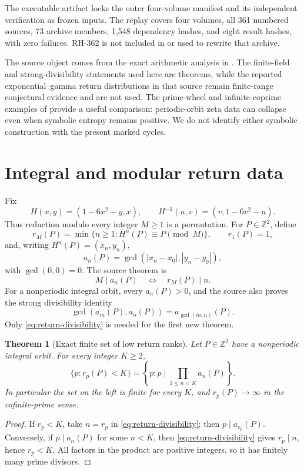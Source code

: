 \documentclass[11pt]{article}
\newtheorem{theorem}{Theorem}[section]
\theoremstyle{remark}
\newcommand{\Z}{\mathbb Z}
\begin{document}
The executable artifact locks the outer four-volume manifest and its
independent verification as frozen inputs.  The replay covers four volumes,
all 361 numbered sources, 73 archive members, 1,548 dependency hashes, and
eight result hashes, with zero failures.  RH-362 is not included in or used to
rewrite that archive.

The source object comes from the exact arithmetic analysis in
\citet{WangPrimeReturns2026}.  The finite-field and strong-divisibility
statements used here are theorems, while the reported exponential--gamma
return distributions in that source remain finite-range conjectural evidence
and are not used.  The prime-wheel and infinite-coprime examples of
\citet{WangPeriodicCollapse2026} provide a useful comparison: periodic-orbit
zeta data can collapse even when symbolic entropy remains positive.  We do
not identify either symbolic construction with the present marked cycles.

\section{Integral and modular return data}

Fix
\[
 H(x,y)=(1-6x^2-y,x),
 \qquad
 H^{-1}(u,v)=(v,1-6v^2-u).
\]
Thus reduction modulo every integer \(M\ge1\) is a permutation.  For
\(P\in\Z^2\), define
\[
 r_M(P)=\min\{n\ge1:H^n(P)\equiv P\pmod M\},
 \qquad r_1(P)=1,
\]
and, writing \(H^n(P)=(x_n,y_n)\),
\[
 a_n(P)=\gcd(|x_n-x_0|,|y_n-y_0|),
\]
with \(\gcd(0,0)=0\).  The source theorem is
\begin{equation}
 M\mid a_n(P)
 \quad\Longleftrightarrow\quad
 r_M(P)\mid n.
 \label{eq:return-divisibility}
\end{equation}
For a nonperiodic integral orbit, every \(a_n(P)>0\), and the source also
proves the strong divisibility identity
\[
 \gcd(a_m(P),a_n(P))=a_{\gcd(m,n)}(P).
\]
Only \eqref{eq:return-divisibility} is needed for the first new theorem.

\begin{theorem}[Exact finite set of low return ranks]
\label{thm:low-ranks}
Let \(P\in\Z^2\) have a nonperiodic integral orbit.  For every integer
\(K\ge2\),
\[
 \{p:r_p(P)<K\}
 =
 \left\{p:p\mid\prod_{1\le n<K}a_n(P)\right\}.
 \label{eq:low-rank-set}
\]
In particular the set on the left is finite for every \(K\), and
\(r_p(P)\to\infty\) in the cofinite-prime sense.
\end{theorem}

\begin{proof}
If \(r_p<K\), take \(n=r_p\) in \eqref{eq:return-divisibility}; then
\(p\mid a_{r_p}(P)\).  Conversely, if \(p\mid a_n(P)\) for some \(n<K\),
then \eqref{eq:return-divisibility} gives \(r_p\mid n\), hence \(r_p<K\).
All factors in the product are positive integers, so it has finitely many
prime divisors.
\end{proof}
\end{document}
